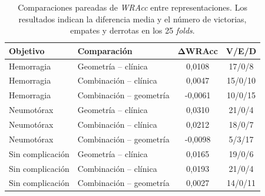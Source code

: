 \begin{table}[!htbp]
    \centering
    \small
    \caption{Comparaciones pareadas de \textit{WRAcc} entre representaciones. Los resultados indican la diferencia media y el número de victorias, empates y derrotas en los 25 \textit{folds}.}
    \label{tab:sd_ablacion_pareada}
    \begin{tabular}{llcc}
        \hline
        \textbf{Objetivo} &
        \textbf{Comparación} &
        \(\boldsymbol{\Delta}\)\textbf{WRAcc} &
        \textbf{V/E/D} \\
        \hline

        Hemorragia &
        Geometría -- clínica &
        0,0108 &
        17/0/8 \\

        Hemorragia &
        Combinación -- clínica &
        0,0047 &
        15/0/10 \\

        Hemorragia &
        Combinación -- geometría &
        -0,0061 &
        10/0/15 \\
        \hline

        Neumotórax &
        Geometría -- clínica &
        0,0310 &
        21/0/4 \\

        Neumotórax &
        Combinación -- clínica &
        0,0212 &
        18/0/7 \\

        Neumotórax &
        Combinación -- geometría &
        -0,0098 &
        5/3/17 \\
        \hline

        Sin complicación &
        Geometría -- clínica &
        0,0165 &
        19/0/6 \\

        Sin complicación &
        Combinación -- clínica &
        0,0193 &
        21/0/4 \\

        Sin complicación &
        Combinación -- geometría &
        0,0027 &
        14/0/11 \\
        \hline
    \end{tabular}
\end{table}


